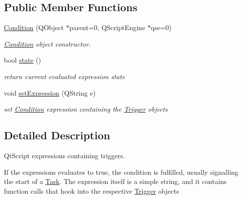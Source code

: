 \subsection*{Public Member Functions}
\begin{CompactItemize}
\item 
\hypertarget{class_condition_2a631f2e03daa7e001aa2545a1fff149}{
\hyperlink{class_condition_2a631f2e03daa7e001aa2545a1fff149}{Condition} (QObject $\ast$parent=0, QScriptEngine $\ast$qse=0)}
\label{class_condition_2a631f2e03daa7e001aa2545a1fff149}

\begin{CompactList}\small\item\em \hyperlink{class_condition}{Condition} object constructor. \item\end{CompactList}\item 
\hypertarget{class_condition_e37e6db989d294d32e562fc10dbbe8d8}{
bool \hyperlink{class_condition_e37e6db989d294d32e562fc10dbbe8d8}{state} ()}
\label{class_condition_e37e6db989d294d32e562fc10dbbe8d8}

\begin{CompactList}\small\item\em return current evaluated expression state \item\end{CompactList}\item 
\hypertarget{class_condition_5093a91c0282a10852c32381ecf45835}{
void \hyperlink{class_condition_5093a91c0282a10852c32381ecf45835}{setExpression} (QString e)}
\label{class_condition_5093a91c0282a10852c32381ecf45835}

\begin{CompactList}\small\item\em set \hyperlink{class_condition}{Condition} expression containing the \hyperlink{interface_trigger}{Trigger} objects \item\end{CompactList}\end{CompactItemize}


\subsection{Detailed Description}
QtScript expressions containing triggers. 

If the expressions evaluates to true, the condition is fulfilled, usually signalling the start of a \hyperlink{class_task}{Task}. The expression itself is a simple string, and it contains function calls that hook into the respective \hyperlink{interface_trigger}{Trigger} objects 

